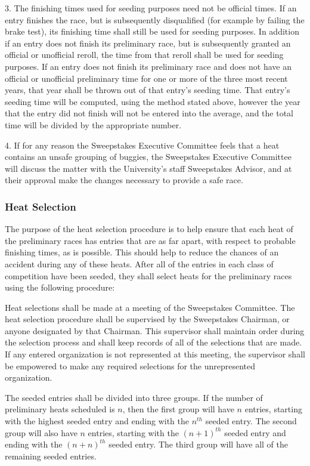 \documentclass[openany]{book}
\begin{document}
3. The finishing times used for seeding purposes need not be official times. If an entry finishes the race, but is subsequently disqualified (for example by failing the brake test), its finishing time shall still be used for seeding purposes. In addition if an entry does not finish its preliminary race, but is subsequently granted an official or unofficial reroll, the time from that reroll shall be used for seeding purposes. If an entry does not finish its preliminary race and does not have an official or unofficial preliminary time for one or more of the three most recent years, that year shall be thrown out of that entry’s seeding time. That entry’s seeding time will be computed, using the method stated above, however the year that the entry did not finish will not be entered into the average, and the total time will be divided by the appropriate number.

4. If for any reason the Sweepstakes Executive Committee feels that a heat contains an unsafe grouping of buggies, the Sweepstakes Executive Committee will discuss the matter with the University’s staff Sweepstakes Advisor, and at their approval make the changes necessary to provide a safe race.

\subsubsection{Heat Selection}

The purpose of the heat selection procedure is to help ensure that each heat of the preliminary races has entries that are as far apart, with respect to probable finishing times, as is possible. This should help to reduce the chances of an accident during any of these heats. After all of the entries in each class of competition have been seeded, they shall select heats for the preliminary races using the following procedure:

Heat selections shall be made at a meeting of the Sweepstakes Committee. The heat selection procedure shall be supervised by the Sweepstakes Chairman, or anyone designated by that Chairman. This supervisor shall maintain order during the selection process and shall keep records of all of the selections that are made. If any entered organization is not represented at this meeting, the supervisor shall be empowered to make any required selections for the unrepresented organization.

The seeded entries shall be divided into three groups. If the number of preliminary heats scheduled is $n$, then the first group will have $n$ entries, starting with the highest seeded entry and ending with the $n^{th}$ seeded entry. The second group will also have $n$ entries, starting with the $(n+1)^{th}$ seeded entry and ending with the $(n+n)^{th}$ seeded entry. The third group will have all of the remaining seeded entries.
\end{document}
